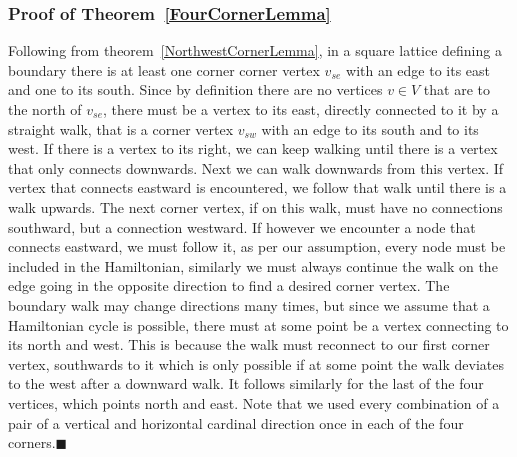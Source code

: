 \subsubsection*{Proof of Theorem~\ref{FourCornerLemma}}
Following from theorem~\ref{NorthwestCornerLemma}, in a square lattice defining a boundary there is at least one corner corner vertex $v_{se}$ with an edge to its east and one to its south. Since by definition there are no vertices $v\in V$ that are to the north of $v_{se}$, there must be a vertex to its east, directly connected to it by a straight walk, that is a corner vertex $v_{sw}$ with an edge to its south and to its west. If there is a vertex to its right, we can keep walking until there is a vertex that only connects downwards. Next we can walk downwards from this vertex. If vertex that connects eastward is encountered, we follow that walk until there is a walk upwards. The next corner vertex, if on this walk, must have no connections southward, but a connection westward. If however we encounter a node that connects eastward, we must follow it, as per our assumption, every node must be included in the Hamiltonian, similarly we must always continue the walk on the edge going in the opposite direction to find a desired corner vertex. The boundary walk may change directions many times, but since we assume that a Hamiltonian cycle is possible, there must at some point be a vertex connecting to its north and west. This is because the walk  must  reconnect to our first corner vertex, southwards to it which is only possible if at some point the walk deviates to the west after a downward walk. It follows similarly for the last of the four vertices, which points north and east. Note that we used every combination of a pair of a vertical and horizontal cardinal direction once in each of the four corners.$\blacksquare$
